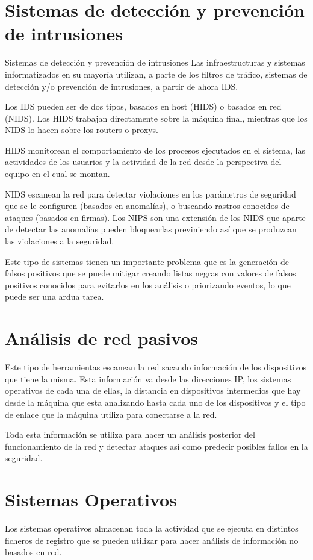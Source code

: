 \section{Sistemas de detección y prevención de intrusiones}\cite{ASV}
Sistemas de detección y prevención de intrusiones
Las infraestructuras y sistemas informatizados en su mayoría utilizan, a parte de los filtros de tráfico, sistemas de detección y/o prevención de intrusiones, a partir de ahora IDS.
\bigskip

Los IDS pueden ser de dos tipos, basados en host (HIDS) o basados en red (NIDS). Los HIDS trabajan directamente sobre la máquina final, mientras que los NIDS lo hacen sobre los routers o proxys.
\bigskip

HIDS monitorean el comportamiento de los procesos ejecutados en el sistema, las actividades de los usuarios y la actividad de la red desde la perspectiva del equipo en el cual se montan.
\bigskip

NIDS escanean la red para detectar violaciones en los parámetros de seguridad que se le configuren (basados en anomalías), o buscando rastros conocidos de ataques (basados en firmas). Los NIPS son una extensión de los NIDS que aparte de detectar las anomalías pueden bloquearlas previniendo así que se produzcan las violaciones a la seguridad.
\bigskip

Este tipo de sistemas tienen un importante problema que es la generación de falsos positivos que se puede mitigar creando listas negras con valores de falsos positivos conocidos para evitarlos en los análisis o priorizando eventos, lo que puede ser una ardua tarea.
\bigskip

\section{Análisis de red pasivos}\cite{ASV}
Este tipo de herramientas escanean la red sacando información de los dispositivos que tiene la misma. Esta información va desde las direcciones IP, los sistemas operativos de cada una de ellas, la distancia en dispositivos intermedios que hay desde la máquina que esta analizando hasta cada uno de los dispositivos y el tipo de enlace que la máquina utiliza para conectarse a la red.
\bigskip

Toda esta información se utiliza para hacer un análisis posterior del funcionamiento de la red y detectar ataques así como predecir posibles fallos en la seguridad.
\bigskip

\section{Sistemas Operativos}\cite{ASV}
Los sistemas operativos almacenan toda la actividad que se ejecuta en distintos ficheros de registro que se pueden utilizar para hacer análisis de información no basados en red.
\bigskip

